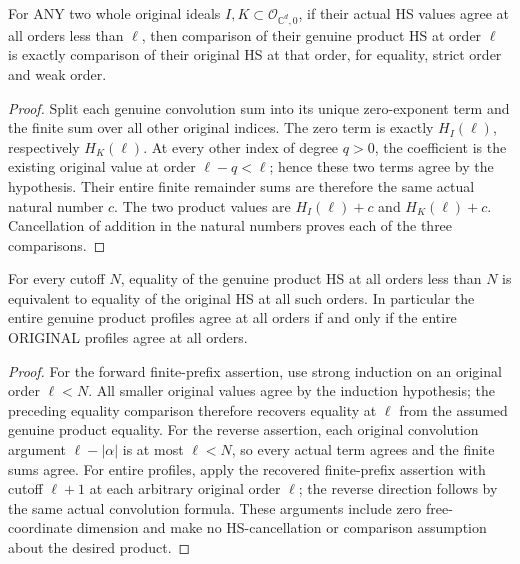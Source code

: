 \begin{lemma}
\label{hir:actual-product-hs-first-difference-comparison}
\leanok
For ANY two whole original ideals $I,K\subset\mathcal O_{\mathbb C^d,0}$,
if their actual HS values agree at all orders less than $\ell$, then
comparison of their genuine product HS at order $\ell$ is exactly
comparison of their original HS at that order, for equality, strict order
and weak order.
\end{lemma}
\begin{proof}
Split each genuine convolution sum into its unique zero-exponent term
and the finite sum over all other original indices. The zero term is
exactly $H_I(\ell)$, respectively $H_K(\ell)$. At every other index of
degree $q>0$, the coefficient is the existing original value at order
$\ell-q<\ell$; hence these two terms agree by the hypothesis. Their entire
finite remainder sums are therefore the same actual natural number $c$.
The two product values are $H_I(\ell)+c$ and $H_K(\ell)+c$. Cancellation
of addition in the natural numbers proves each of the three comparisons.
\end{proof}

\begin{theorem}
\label{hir:actual-product-entire-hs-profile-reflection}
\leanok
For every cutoff $N$, equality of the genuine product HS at all orders
less than $N$ is equivalent to equality of the original HS at all such
orders. In particular the entire genuine product profiles agree at all
orders if and only if the entire ORIGINAL profiles agree at all orders.
\end{theorem}
\begin{proof}
For the forward finite-prefix assertion, use strong induction on an
original order $\ell<N$. All smaller original values agree by the
induction hypothesis; the preceding equality comparison therefore
recovers equality at $\ell$ from the assumed genuine product equality.
For the reverse assertion, each original convolution argument
$\ell-|\alpha|$ is at most $\ell<N$, so every actual term agrees and the
finite sums agree. For entire profiles, apply the recovered finite-prefix
assertion with cutoff $\ell+1$ at each arbitrary original order $\ell$;
the reverse direction follows by the same actual convolution formula.
These arguments include zero free-coordinate dimension and make no
HS-cancellation or comparison assumption about the desired product.
\end{proof}

